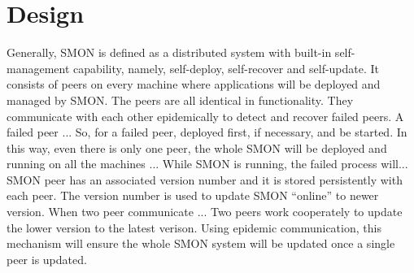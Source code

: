 \section{Design}

Generally, SMON is defined as a distributed system with
built-in self-management capability, namely, self-deploy,
self-recover and self-update. It consists of peers on every
machine where applications will be deployed and managed by
SMON. The peers are all identical in functionality. They
communicate with each other epidemically to detect and
recover failed peers. A failed peer ... So, for a failed
peer, deployed first, if necessary, and be started. In this
way, even there is only one peer, the whole SMON will be
deployed and running on all the machines ... While SMON is
running, the failed process will... SMON peer has an
associated version number and it is stored persistently with
each peer. The version number is used to update SMON
``online'' to newer version. When two peer communicate ...
Two peers work cooperately to update the lower version to
the latest verison. Using epidemic communication, this
mechanism will ensure the whole SMON system will be updated
once a single peer is updated.




